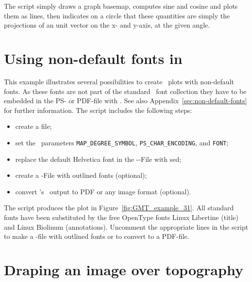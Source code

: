 
The script simply draws a graph basemap, computes sine and cosine and plots them as lines, then
indicates on a circle that these quantities are simply the projections of an unit vector on the
x- and y-axis, at the given angle.

 

\section{Using non-default fonts in \PS}
\label{sec:non-default-fonts-example}

This example illustrates several possibilities to create \GMT\
plots with non-default fonts. As these fonts are not part of the
standard \PS\ font collection they have to be embedded in the PS-
or PDF-file with \progname{Ghostscript}. See also
Appendix~\ref{sec:non-default-fonts} for further information. The
script includes the following steps:

\begin{itemize}
\item create a  file;
\item set the \GMT\ parameters \verb#MAP_DEGREE_SYMBOL#,
  \verb#PS_CHAR_ENCODING#, and \verb#FONT#;
\item replace the default Helvetica font in the \GMT-\PS-File with
  sed;
\item create a \PS-File with outlined fonts (optional);
\item convert \GMT's \PS\ output to PDF or any image format
  (optional).
\end{itemize}


The script produces the plot in
Figure~\ref{fig:GMT_example_31}. All standard fonts have been
substituted by the free OpenType fonts Linux Libertine (title) and
Linux Biolinum (annotations). Uncomment the appropriate lines in
the script to make a \PS-file with outlined fonts or to convert to
a PDF-file.

 

\section{Draping an image over topography}

